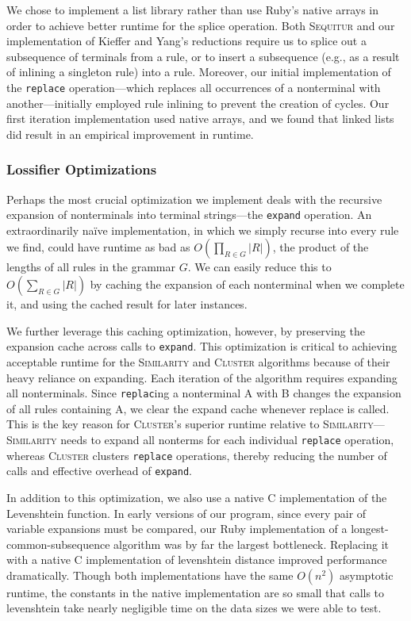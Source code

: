 \documentclass[11pt]{article}
\newcommand{\Sequitur}{\textsc{Sequitur}\xspace}
\newcommand{\Similarity}{\textsc{Similarity}\xspace}
\newcommand{\Cluster}{\textsc{Cluster}\xspace}
\begin{document}
We chose to implement a list library rather than use Ruby's native arrays in
order to achieve better runtime for the splice operation.  Both \Sequitur and
our implementation of Kieffer and Yang's reductions require us to splice out a
subsequence of terminals from a rule, or to insert a subsequence (e.g., as a
result of inlining a singleton rule) into a rule.  Moreover, our initial
implementation of the \texttt{replace} operation---which replaces all
occurrences of a nonterminal with another---initially employed rule inlining to
prevent the creation of cycles.  Our first iteration implementation used native
arrays, and we found that linked lists did result in an empirical improvement
in runtime.

\subsubsection{Lossifier Optimizations}

Perhaps the most crucial optimization we implement deals with the recursive
expansion of nonterminals into terminal strings---the \texttt{expand}
operation.  An extraordinarily na\"ive implementation, in which we simply
recurse into every rule we find, could have runtime as bad as $O(\prod_{R \in
G} |R|)$, the product of the lengths of all rules in the grammar $G$.  We can
easily reduce this to $O(\sum_{R \in G} |R|)$ by caching the expansion of each
nonterminal when we complete it, and using the cached result for later
instances.

We further leverage this caching optimization, however, by preserving the
expansion cache across calls to \texttt{expand}.  This optimization is critical
to achieving acceptable runtime for the \Similarity and \Cluster algorithms
because of their heavy reliance on expanding.  Each iteration of the algorithm
requires expanding all nonterminals.  Since \texttt{replac}ing a nonterminal A
with B changes the expansion of all rules containing A, we clear the expand
cache whenever replace is called.  This is the key reason for \Cluster's
superior runtime relative to \Similarity---\Similarity needs to expand all
nonterms for each individual \texttt{replace} operation, whereas \Cluster
clusters \texttt{replace} operations, thereby reducing the number of calls and
effective overhead of \texttt{expand}.

In addition to this optimization, we also use a native C implementation of the
Levenshtein function. In early versions of our program,
since every pair of variable expansions must be compared,
our Ruby implementation of a longest-common-subsequence algorithm was by far the
largest bottleneck. Replacing it with a native C implementation of levenshtein
distance improved performance dramatically. Though both implementations have the
same $O(n^2)$ asymptotic runtime, the constants in the native implementation
are so small that calls to levenshtein take nearly negligible time on the data
sizes we were able to test.
\end{document}

